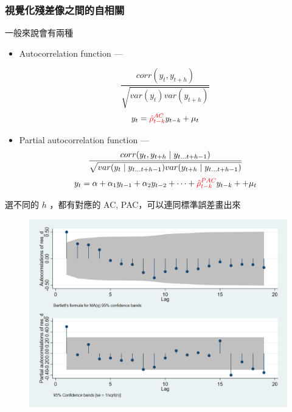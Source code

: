 \begin{frame}
    \frametitle{視覺化殘差像之間的自相關}
    一般來說會有兩種
    \begin{itemize}
        \item Autocorrelation function --- 
        
        \begin{equation*}
            \frac{corr(y_t, y_{t+h})}{\sqrt{var(y_t) var(y_{t+h})}}
        \end{equation*}
        \begin{equation*}
            y_t = {\color{red} \hat{\rho}^{AC}_{t-k}} y_{t-k} + \mu_t
        \end{equation*}
        \item Partial autocorrelation function --- 
        \begin{equation*}
            \frac{corr(y_t , y_{t+h} \mid y_{t\dots t+h-1} )}{\sqrt{var(y_t\mid y_{t\dots t+h-1})var(y_{t+h}\mid y_{t\dots t+h-1})}}
        \end{equation*}
        \begin{equation*}
            y_t = \alpha + \alpha_1 y_{t-1} +\alpha_2 y_{t-2} + \dots + {\color{red} \hat{\rho}^{PAC}_{t-k}} y_{t-k} +  + \mu_t
        \end{equation*}
    \end{itemize}

    選不同的 $h$ ，都有對應的 AC, PAC，可以連同標準誤差畫出來

\end{frame}

\begin{frame}
    \begin{figure}
        \includegraphics[width=\textwidth]{../Results/ac pac.png}
    \end{figure}
\end{frame}